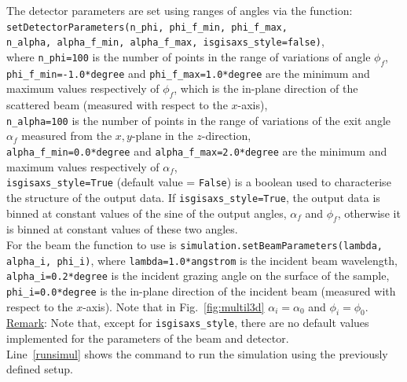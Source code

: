 \noindent The detector parameters are set using ranges of angles via
the function:\\

\noindent \texttt{setDetectorParameters(n\_phi, phi\_f\_min,
  phi\_f\_max,\\ \phantom{setDetectorParameters(}n\_alpha, alpha\_f\_min, alpha\_f\_max, isgisaxs\_style=false)}, \\

\noindent where \texttt{n\_phi=100} is the number of points in the range of
variations of angle $\phi_f$,\\ \texttt{phi\_f\_min=-1.0*degree} and \texttt{phi\_f\_max=1.0*degree}
are the minimum and maximum values respectively of $\phi_f$, which is the in-plane direction of the scattered beam
(measured with respect to the $x$-axis), \\ \texttt{n\_alpha=100} is
the number of points in the range of variations of the exit angle
$\alpha_f$ measured from the $x,y$-plane in the $z$-direction,\\ \texttt{alpha\_f\_min=0.0*degree} and \texttt{alpha\_f\_max=2.0*degree} 
are the minimum and maximum values respectively of $\alpha_f$,\\
\texttt{isgisaxs\_style=True} (default value = \texttt{False}) is a boolean
used to characterise the structure of the output data. If
\texttt{isgisaxs\_style=True}, the output data is binned at constant
values of the sine of the output angles, $\alpha_f$ and $\phi_f$, otherwise it is binned
at constant values of these two angles.\\


\noindent For the beam the function to use is
\texttt{simulation.setBeamParameters(lambda, alpha\_i, phi\_i)}, where
\texttt{lambda=1.0*angstrom} is the incident beam wavelength,\\
\texttt{alpha\_i=0.2*degree} is the incident
grazing angle on the surface of the sample,
\texttt{phi\_i=0.0*degree} is the in-plane
direction of the incident beam (measured with respect to the
$x$-axis). Note that in Fig.~\ref{fig:multil3d} $\alpha_i=\alpha_0$ and $\phi_i=\phi_0$.\\ 

\noindent \underline{Remark}: Note that, except for
\texttt{isgisaxs\_style}, there are no default values implemented for the
parameters of the beam and detector.\\

\noindent Line~\ref{runsimul} shows the command to run the simulation using the
previously defined setup.


